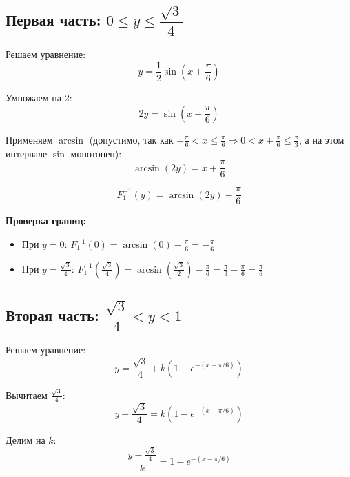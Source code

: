 \documentclass[12pt,a4paper]{article}
\begin{document}
\subsection*{Первая часть: $0 \leq y \leq \dfrac{\sqrt{3}}{4}$}

Решаем уравнение:
\begin{equation}
y = \frac{1}{2}\sin\left(x+\frac{\pi}{6}\right)
\end{equation}

Умножаем на 2:
\begin{equation}
2y = \sin\left(x+\frac{\pi}{6}\right)
\end{equation}

Применяем $\arcsin$ (допустимо, так как $-\frac{\pi}{6} < x \leq \frac{\pi}{6} \Rightarrow 0 < x+\frac{\pi}{6} \leq \frac{\pi}{3}$, а на этом интервале $\sin$ монотонен):
\begin{equation}
\arcsin(2y) = x + \frac{\pi}{6}
\end{equation}

\begin{equation}
F_1^{-1}(y) = \arcsin(2y) - \frac{\pi}{6}
\end{equation}

\textbf{Проверка границ:}
\begin{itemize}
    \item При $y = 0$: $F_1^{-1}(0) = \arcsin(0) - \frac{\pi}{6} = -\frac{\pi}{6}$
    \item При $y = \frac{\sqrt{3}}{4}$: $F_1^{-1}\left(\frac{\sqrt{3}}{4}\right) = \arcsin\left(\frac{\sqrt{3}}{2}\right) - \frac{\pi}{6} = \frac{\pi}{3} - \frac{\pi}{6} = \frac{\pi}{6}$
\end{itemize}

\subsection*{Вторая часть: $\dfrac{\sqrt{3}}{4} < y < 1$}

Решаем уравнение:
\begin{equation}
y = \frac{\sqrt{3}}{4} + k\left(1-e^{-(x-\pi/6)}\right)
\end{equation}

Вычитаем $\frac{\sqrt{3}}{4}$:
\begin{equation}
y - \frac{\sqrt{3}}{4} = k\left(1-e^{-(x-\pi/6)}\right)
\end{equation}

Делим на $k$:
\begin{equation}
\frac{y - \frac{\sqrt{3}}{4}}{k} = 1 - e^{-(x-\pi/6)}
\end{equation}
\end{document}
